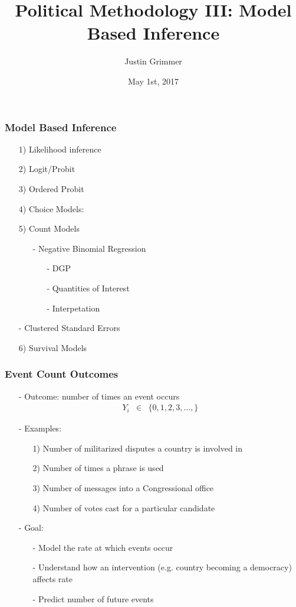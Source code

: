 \documentclass{beamer}
\title[Methodology III] %
{Political Methodology III: Model Based Inference}
\author{Justin Grimmer}
\institute[Stanford University]{Associate Professor\\Department of Political Science \\  Stanford University}
\date{May 1st, 2017}
\begin{document}
\begin{frame}
\titlepage
\end{frame}


\begin{frame}
\frametitle{Model Based Inference}

\begin{itemize}
\item[1)] Likelihood inference
\item[2)] Logit/Probit
\item[3)] Ordered Probit
\item[4)] Choice Models:
\item[5)] Count Models
\begin{itemize}
\item[-] Negative Binomial Regression
\begin{itemize}
\item[-] DGP
\item[-] Quantities of Interest
\item[-] Interpetation
\end{itemize}
\end{itemize}
\item[-] Clustered Standard Errors
\item[6)] Survival Models
\end{itemize}

\end{frame}


\begin{frame}
\frametitle{Event Count Outcomes}

\begin{itemize}
\item[-] Outcome: number of times an event occurs
\begin{eqnarray}
Y_{i} & \in & \{0, 1, 2, 3, \hdots, \} \nonumber
\end{eqnarray}
\item[-] Examples:
\begin{itemize}
\item[1)] Number of militarized disputes a country is involved in
\item[2)] Number of times a phrase is used
\item[3)] Number of messages into a Congressional office
\item[4)] Number of votes cast for a particular candidate
\end{itemize}
\item[-] Goal:
\begin{itemize}
\item[-] Model the \alert{rate} at which events occur
\item[-] Understand how an intervention (e.g. country becoming a democracy) affects rate
\item[-] Predict number of future events
\end{itemize}
\end{itemize}

\end{frame}
\end{document}
